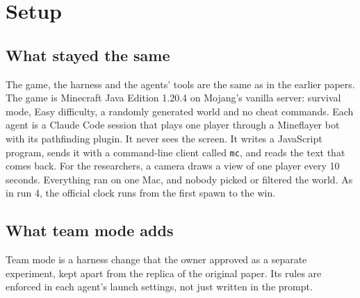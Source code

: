 \documentclass[11pt,a4paper]{article}
\begin{document}
\section{Setup}
\label{sec:setup}

\subsection{What stayed the same}

The game, the harness and the agents' tools are the same as in the earlier papers. The game is Minecraft Java Edition 1.20.4 on Mojang's vanilla server: survival mode, Easy difficulty, a randomly generated world and no cheat commands. Each agent is a Claude Code session \citep{claudecode} that plays one player through a Mineflayer bot \citep{mineflayer} with its pathfinding plugin. It never sees the screen. It writes a JavaScript program, sends it with a command-line client called \texttt{mc}, and reads the text that comes back. For the researchers, a camera draws a view of one player every 10 seconds. Everything ran on one Mac, and nobody picked or filtered the world. As in run 4, the official clock runs from the first spawn to the win.

\subsection{What team mode adds}

Team mode is a harness change that the owner approved as a separate experiment, kept apart from the replica of the original paper. Its rules are enforced in each agent's launch settings, not just written in the prompt.
\end{document}
